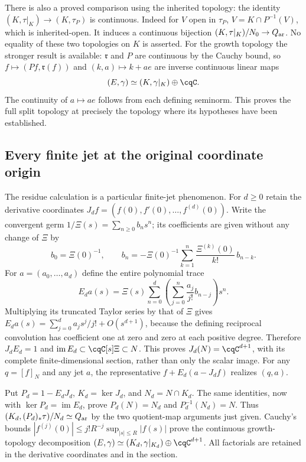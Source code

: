 There is also a proved comparison using the inherited topology:
the identity $(K,\tau|_K)\to(K,\tau_P)$ is continuous.
Indeed for $V$ open in $\tau_P$,
$V=K\cap P^{-1}(V)$, which is inherited-open.
It induces a continuous bijection
$(K,\tau|_K)/N_0\to Q_{\rm ar}$.
No equality of these two topologies on $K$ is asserted.
For the growth topology the stronger result is available:
$\mathfrak r$ and $P$ are continuous by the Cauchy bound,
so $f\mapsto(Pf,\mathfrak r(f))$ and
$(k,a)\mapsto k+ae$ are inverse continuous linear maps
\begin{equation}
 (E,\gamma)\simeq (K,\gamma|_K)\oplus\cqC .
 \label{eq:cq-residue-growth-splitting}
\end{equation}
The continuity of $a\mapsto ae$ follows from each defining
seminorm. This proves the full split topology at precisely
the topology where its hypotheses have been established.

\subsection{Every finite jet at the original coordinate origin}
The residue calculation is a particular finite-jet phenomenon.
For $d\ge0$ retain the derivative coordinates
$J_d f=(f(0),f'(0),\ldots,f^{(d)}(0))$.
Write the convergent germ
$1/\Xi(s)=\sum_{n\ge0}b_ns^n$; its coefficients are given
without any change of $\Xi$ by
\[
 b_0=\Xi(0)^{-1},\qquad
 b_n=-\Xi(0)^{-1}
       \sum_{k=1}^n\frac{\Xi^{(k)}(0)}{k!}\,b_{n-k}.
\]
For $a=(a_0,\ldots,a_d)$ define the entire polynomial trace
\begin{equation}
 E_da(s)=\Xi(s)\sum_{n=0}^d
           \left(\sum_{j=0}^n\frac{a_j}{j!}b_{n-j}\right)s^n.
 \label{eq:cq-origin-jet-section}
\end{equation}
Multiplying its truncated Taylor series by that of $\Xi$
gives $E_da(s)=\sum_{j=0}^d a_js^j/j!+O(s^{d+1})$,
because the defining reciprocal convolution has coefficient
one at zero and zero at each positive degree.
Therefore $J_dE_d=1$ and
$\operatorname{im}E_d\subset\cqC[s]\Xi\subset N$.
This proves $J_d(N)=\cqC^{d+1}$, with its complete
finite-dimensional section, rather than only the scalar image.
For any $q=[f]_N$ and any jet $a$, the representative
$f+E_d(a-J_df)$ realizes $(q,a)$.

Put $P_d=1-E_dJ_d$, $K_d=\ker J_d$, and
$N_d=N\cap K_d$. The same identities, now with
$\ker P_d=\operatorname{im}E_d$, prove
$P_d(N)=N_d$ and $P_d^{-1}(N_d)=N$.
Thus $(K_d,(P_d)_*\tau)/N_d\simeq Q_{\rm ar}$ by the
two quotient-map arguments just given. Cauchy's bounds
$|f^{(j)}(0)|\le j!R^{-j}\sup_{|s|\le R}|f(s)|$
prove the continuous growth-topology decomposition
$(E,\gamma)\simeq (K_d,\gamma|_{K_d})\oplus\cqC^{d+1}$.
All factorials are retained in the derivative coordinates
and in the section.

